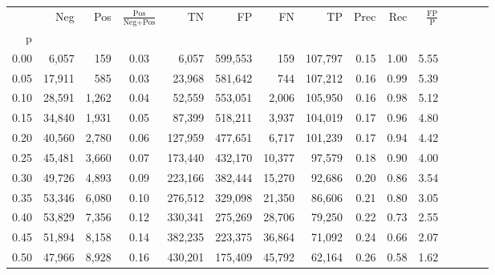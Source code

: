\begin{tabular}{rrrcrrrrrrrrrrr}
\toprule
{} &     Neg &    Pos & $\frac{\text{Pos}}{\text{Neg}+\text{Pos}}$ &       TN &       FP &       FN &       TP &  Prec &   Rec & $\frac{\text{FP}}{\text{P}}$ \\
p    &         &        &                                            &          &          &          &          &       &       &                              \\
\midrule
0.00 &   6,057 &    159 &                                       0.03 &    6,057 &  599,553 &      159 &  107,797 &  0.15 &  1.00 &                         5.55 \\
0.05 &  17,911 &    585 &                                       0.03 &   23,968 &  581,642 &      744 &  107,212 &  0.16 &  0.99 &                         5.39 \\
0.10 &  28,591 &  1,262 &                                       0.04 &   52,559 &  553,051 &    2,006 &  105,950 &  0.16 &  0.98 &                         5.12 \\
0.15 &  34,840 &  1,931 &                                       0.05 &   87,399 &  518,211 &    3,937 &  104,019 &  0.17 &  0.96 &                         4.80 \\
0.20 &  40,560 &  2,780 &                                       0.06 &  127,959 &  477,651 &    6,717 &  101,239 &  0.17 &  0.94 &                         4.42 \\
0.25 &  45,481 &  3,660 &                                       0.07 &  173,440 &  432,170 &   10,377 &   97,579 &  0.18 &  0.90 &                         4.00 \\
0.30 &  49,726 &  4,893 &                                       0.09 &  223,166 &  382,444 &   15,270 &   92,686 &  0.20 &  0.86 &                         3.54 \\
0.35 &  53,346 &  6,080 &                                       0.10 &  276,512 &  329,098 &   21,350 &   86,606 &  0.21 &  0.80 &                         3.05 \\
0.40 &  53,829 &  7,356 &                                       0.12 &  330,341 &  275,269 &   28,706 &   79,250 &  0.22 &  0.73 &                         2.55 \\
0.45 &  51,894 &  8,158 &                                       0.14 &  382,235 &  223,375 &   36,864 &   71,092 &  0.24 &  0.66 &                         2.07 \\
0.50 &  47,966 &  8,928 &                                       0.16 &  430,201 &  175,409 &   45,792 &   62,164 &  0.26 &  0.58 &                         1.62 \\

\end{tabular}
